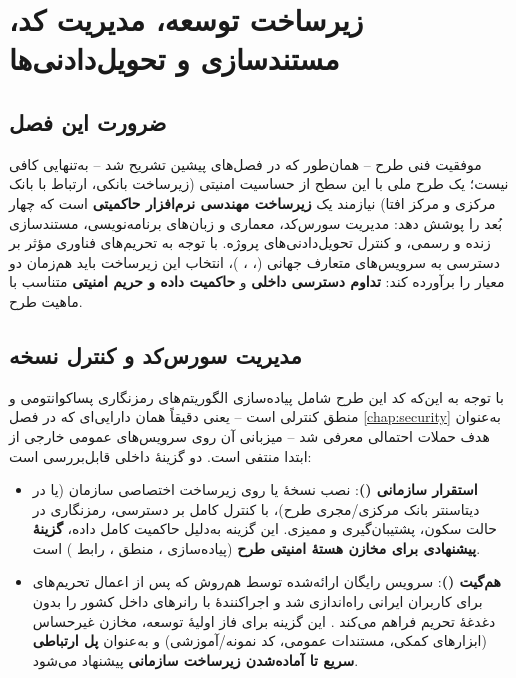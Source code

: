 \chapter{زیرساخت توسعه، مدیریت کد، مستندسازی و تحویل‌دادنی‌ها}
\label{chap:devops}

\section{ضرورت این فصل}

موفقیت فنی طرح -- همان‌طور که در فصل‌های پیشین تشریح شد -- به‌تنهایی کافی نیست؛ یک طرح ملی با این سطح از حساسیت امنیتی (زیرساخت بانکی، ارتباط با بانک مرکزی و مرکز افتا) نیازمند یک \textbf{زیرساخت مهندسی نرم‌افزار حاکمیتی} است که چهار بُعد را پوشش دهد: مدیریت سورس‌کد، معماری و زبان‌های برنامه‌نویسی، مستندسازی زنده و رسمی، و کنترل تحویل‌دادنی‌های پروژه. با توجه به تحریم‌های فناوری مؤثر بر دسترسی به سرویس‌های متعارف جهانی (، ، )، انتخاب این زیرساخت باید هم‌زمان دو معیار را برآورده کند: \textbf{تداوم دسترسی داخلی} و \textbf{حاکمیت داده و حریم امنیتی} متناسب با ماهیت طرح.

\section{مدیریت سورس‌کد و کنترل نسخه}
\label{sec:vcsgovernance}

با توجه به این‌که کد این طرح شامل پیاده‌سازی الگوریتم‌های رمزنگاری پساکوانتومی و منطق کنترلی  است -- یعنی دقیقاً همان دارایی‌ای که در فصل \ref{chap:security} به‌عنوان هدف حملات احتمالی معرفی شد -- میزبانی آن روی سرویس‌های عمومی خارجی از ابتدا منتفی است. دو گزینهٔ داخلی قابل‌بررسی است:

\begin{itemize}
\item \textbf{استقرار  سازمانی ()}: نصب نسخهٔ  یا  روی زیرساخت اختصاصی سازمان (یا در دیتاسنتر بانک مرکزی/مجری طرح)، با کنترل کامل بر دسترسی، رمزنگاری در حالت سکون، پشتیبان‌گیری و ممیزی. این گزینه به‌دلیل حاکمیت کامل داده، \textbf{گزینهٔ پیشنهادی برای مخازن هستهٔ امنیتی طرح} (پیاده‌سازی ، منطق ، رابط ) است.
\item \textbf{هم‌گیت ()}: سرویس رایگان  ارائه‌شده توسط هم‌روش که پس از اعمال تحریم‌های  برای کاربران ایرانی راه‌اندازی شد و اجراکنندهٔ  با رانرهای داخل کشور را بدون دغدغهٔ تحریم فراهم می‌کند \Cite{hamgit2026}. این گزینه برای فاز اولیهٔ توسعه، مخازن غیرحساس (ابزارهای کمکی، مستندات عمومی، کد نمونه/آموزشی) و به‌عنوان \textbf{پل ارتباطی سریع تا آماده‌شدن زیرساخت سازمانی} پیشنهاد می‌شود.
\end{itemize}

